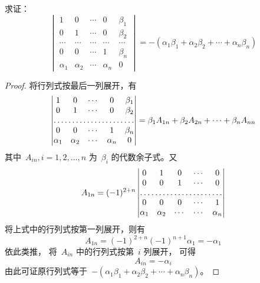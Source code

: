 \documentclass[twoside,openright]{book}
\begin{document}
\begin{CJK*}{UTF8}{}
\begin{quest}
\label{quest:72}
求证：
\[
\begin{vmatrix}
1        & 0        & \dotsm & 0        & \beta_1 \\
0        & 1        & \dotsm & 0        & \beta_2 \\
\dotsm   & \dotsm   & \dotsm & \dotsm   & \dotsm  \\
0        & 0        & \dotsm & 1        & \beta_n \\
\alpha_1 & \alpha_2 & \dotsm & \alpha_n & 0
\end{vmatrix}
=
- \left( \alpha_1 \beta_1 + \alpha_2 \beta_2 + \dotsm + \alpha_n \beta_n \right)
\]
\end{quest}
\begin{proof}
将行列式按最后一列展开，有
\[
\begin{vmatrix}
1        & 0        & \dotsm & 0        & \beta_1 \\
0        & 1        & \dotsm & 0        & \beta_2 \\
\hdotsfor{5} \\
0        & 0        & \dotsm & 1        & \beta_n \\
\alpha_1 & \alpha_2 & \dotsm & \alpha_n & 0
\end{vmatrix}
=\beta_1A_{1n}+\beta_2A_{2n}+\dotsb+\beta_nA_{nn}
\]
其中\ $A_{in},i=1,2,\dotsc,n$ 为\ $\beta_i$ 的代数余子式。又
\[
A_{1n}=(-1)^{2+n}\begin{vmatrix}
0        & 1        & 0      & \dotsm & 0   \\
0        & 0        & 1      & \dotsm & 0   \\
\hdotsfor{5} \\
0        & 0        & 0      & \dotsm & 1    \\
\alpha_1 & \alpha_2 & \dotsm & \dotsm & \alpha_n
\end{vmatrix}
\]
将上式中的行列式按第一列展开，则有
\[
A_{1n}=(-1)^{2+n}(-1)^{n+1}\alpha_1=-\alpha_1
\]
依此类推，
将\ $A_{in}$ 中的行列式按第\ $i$ 列展开，
可得
\[
A_{in}=-\alpha_i
\]
由此可证原行列式等于\ $- \left( \alpha_1 \beta_1 + \alpha_2 \beta_2 + \dotsm + \alpha_n \beta_n \right)$。
\end{proof}


\end{CJK*}
\end{document}

